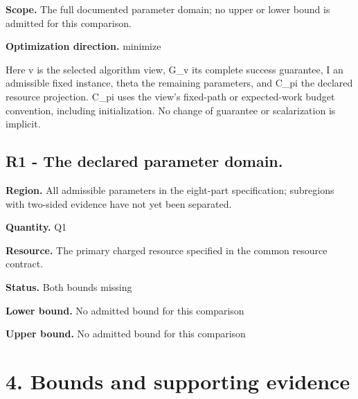 \documentclass[10pt,a4paper]{article}
\begin{document}
\textbf{Scope.} The full documented parameter domain; no upper or lower bound is admitted for this comparison.

\textbf{Optimization direction.} minimize

Here v is the selected algorithm view, G\_v its complete success guarantee, I an admissible fixed instance, theta the remaining parameters, and C\_pi the declared resource projection. C\_pi uses the view's fixed-path or expected-work budget convention, including initialization. No change of guarantee or scalarization is implicit.

\subsection{R1 - The declared parameter domain.}
\textbf{Region.} All admissible parameters in the eight-part specification; subregions with two-sided evidence have not yet been separated.

\textbf{Quantity.} Q1

\textbf{Resource.} The primary charged resource specified in the common resource contract.

\textbf{Status.} Both bounds missing

\textbf{Lower bound.} No admitted bound for this comparison

\textbf{Upper bound.} No admitted bound for this comparison

\section{4. Bounds and supporting evidence}
\end{document}
